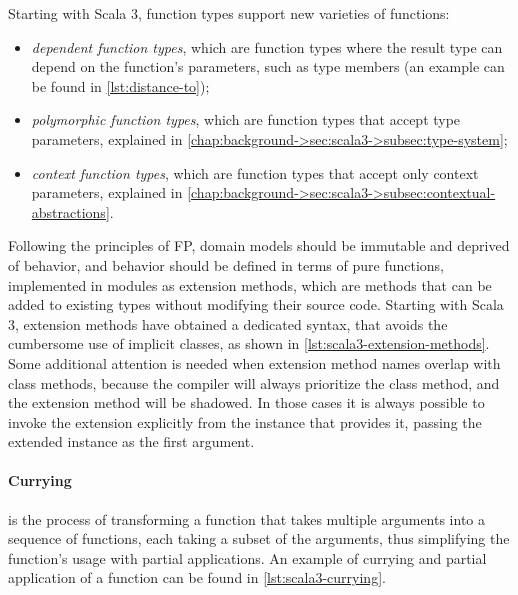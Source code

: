 Starting with Scala 3, function types support new varieties of functions:
\begin{itemize}
    \item \textit{dependent function types}, which are function types where the result type can depend on the function's parameters, such as type members (an example can be found in \cref{lst:distance-to});
    \item \textit{polymorphic function types}, which are function types that accept type parameters, explained in \cref{chap:background->sec:scala3->subsec:type-system};
    \item \textit{context function types}, which are function types that accept only context parameters, explained in \cref{chap:background->sec:scala3->subsec:contextual-abstractions}.
\end{itemize}

Following the principles of \ac{FP}, domain models should be immutable and deprived of behavior, and behavior should be defined in terms of pure functions, implemented in modules as extension methods, which are methods that can be added to existing types without modifying their source code.
%
Starting with Scala 3, extension methods have obtained a dedicated syntax, that avoids the cumbersome use of implicit classes, as shown in \cref{lst:scala3-extension-methods}.
%
Some additional attention is needed when extension method names overlap with class methods, because the compiler will always prioritize the class method, and the extension method will be shadowed.
%
In those cases it is always possible to invoke the extension explicitly from the instance that provides it, passing the extended instance as the first argument.



\paragraph{Currying} is the process of transforming a function that takes multiple arguments into a sequence of functions, each taking a subset of the arguments, thus simplifying the function's usage with partial applications.
%
An example of currying and partial application of a function can be found in \cref{lst:scala3-currying}.




